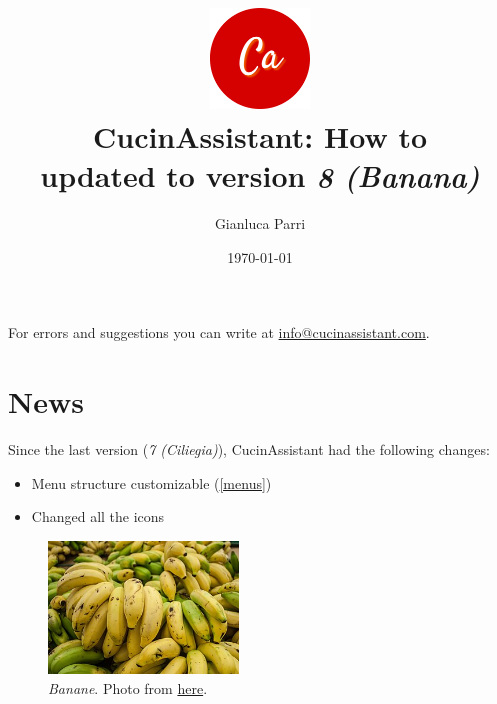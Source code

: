 \documentclass[12pt, a4paper]{article}
\begin{document}
    \title{
        \includegraphics[width=0.2\textwidth]{assets/logo.png}\\
        [0.5cm]CucinAssistant: How to\\
        \large updated to version \emph{8 (Banana)}
    }
    \author{Gianluca Parri}
    \date{\today}
    \maketitle



    \tableofcontents
    \vfill
    \noindent For errors and suggestions you can write at
    \href{mailto:info@cucinassistant.com}{\mbox{info@cucinassistant.com}}.



    \section{News}
    
    Since the last version (\emph{7 (Ciliegia)}), CucinAssistant had the
    following changes:

    \begin{itemize}
        \item Menu structure customizable (\ref{menus})
        \item Changed all the icons
    \end{itemize}

    \begin{figure}[H]
        \centering
        \includegraphics[width=0.45\textwidth]{assets/banane.jpg}
		\caption{\emph{Banane}. Photo from \href{https://commons.wikimedia.org\
            /wiki/File:Cavendish_banana_from_Maracaibo.jpg}{here}.}
    \end{figure}
\end{document}
